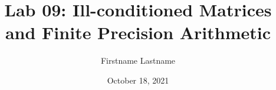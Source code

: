 \newcommand{\course}{MATH 3341}
\title{Lab 09: Ill-conditioned Matrices and Finite Precision Arithmetic}
\author{Firstname Lastname}
\date{October 18, 2021}
